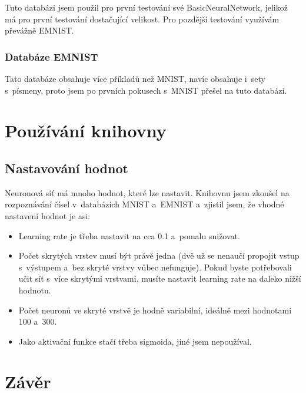 \documentclass[12pt]{report}			%
\begin{document}
					Tuto databázi jsem použil pro první testování své BasicNeuralNetwork, jelikož má pro první testování dostačující velikost. Pro pozdější testování využívám převážně EMNIST.
				\subsection{Databáze EMNIST}
					 \parencite[přeloženo]{article:EMNIST}
					
					Tato databáze obsahuje více příkladů než MNIST, navíc obsahuje i~sety s~písmeny, proto jsem po prvních pokusech s~MNIST přešel na tuto databázi.

		\chapter{Používání knihovny}
			\section{Nastavování hodnot}
				Neuronová síť má mnoho hodnot, které lze nastavit. Knihovnu jsem zkoušel na rozpoznávání čísel v~databázích MNIST a~EMNIST a~zjistil jsem, že vhodné nastavení hodnot je asi:
				\begin{itemize}
					\item Learning rate je třeba nastavit na cca 0.1 a~pomalu snižovat.
					\item Počet skrytých vrstev musí být právě jedna (dvě už se nenaučí propojit vstup s~výstupem a~bez skryté vrstvy vůbec nefunguje). Pokud byste potřebovali učit síť s~více skrytými vrstvami, musíte nastavit learning rate na daleko nižší hodnotu.
					\item Počet neuronů ve skryté vrstvě je hodně variabilní, ideálně mezi hodnotami 100 a~300.
					\item Jako aktivační funkce stačí třeba sigmoida, jiné jsem nepoužíval.
				\end{itemize}


	\appendix
	
	\chapter*{Závěr}
	
\end{document}
